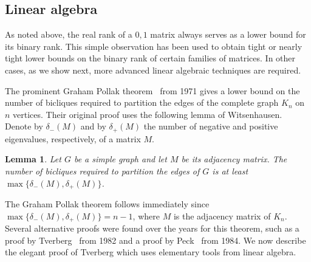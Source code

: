 \documentclass[11pt]{article}
\newtheorem{lemma}[theorem]{Lemma}
\begin{document}
\subsection{Linear algebra}
\label{subsec-linear}
As noted above, the real rank of a $0,1$ matrix always serves as a lower bound for its binary rank.
This simple observation has been used to obtain tight or nearly tight lower bounds on the binary rank of certain families of matrices.
In other cases, as we show next, more advanced linear algebraic techniques are required.

The prominent Graham Pollak theorem~\cite{GrahamP71} from 1971 gives a lower bound on the number of bicliques required to partition the edges of the complete graph $K_n$ on $n$ vertices.
Their original proof uses the following lemma of Witsenhausen.
Denote by  $\delta_{-}(M)$ and by $\delta_{+}(M)$ the number of negative and positive eigenvalues, respectively, of a matrix $M$.

\begin{lemma}
Let $G$ be a simple graph and let $M$ be its adjacency matrix.
The number of bicliques required to partition the edges of $G$ is at least $\max\{\delta_{-}(M),\delta_{+}(M)\}$.
\end{lemma}

The Graham Pollak theorem follows immediately since $\max\{\delta_{-}(M),\delta_{+}(M)\} = n-1$, where $M$ is the adjacency matrix of $K_n$.
Several alternative proofs were found over the years for this theorem, such as a proof by
Tverberg~\cite{Tverberg1982OnTD} from 1982 and a proof by Peck~\cite{peck1984new} from 1984.
We now describe the elegant proof of Tverberg which uses elementary tools from linear algebra.
\end{document}
